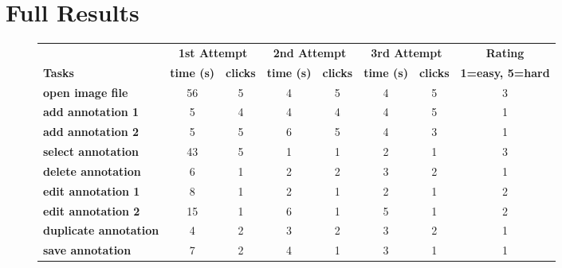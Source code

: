 \section{Full Results}
\label{Appendix}
\begin{figure}[ht]
	\begin{center}
		\begin{tabular}{ | l | c | c | c | c | c | c | c | }
			\hline
			& \multicolumn{2}{|c|}{\bf 1st Attempt} & \multicolumn{2}{|c|}{\bf 2nd Attempt} & \multicolumn{2}{|c|}{\bf 3rd Attempt} & \bf Rating \\
			\bf Tasks & \bf time (s) & \bf clicks & \bf time (s) & \bf clicks & \bf time (s) & \bf clicks & \bf 1=easy, 5=hard \\
			\hline \hline
			\bf open image file & 56 & 5 & 4 & 5 & 4 & 5 & 3 \\
			\bf add annotation 1 & 5 & 4 & 4 & 4 & 4 & 5 & 1 \\
			\bf add annotation 2 & 5 & 5 & 6 & 5 & 4 & 3 & 1 \\
			\bf select annotation & 43 & 5 & 1 & 1 & 2 & 1 & 3 \\
			\bf delete annotation & 6 & 1 & 2 & 2 & 3 & 2 & 1 \\
			\bf edit annotation 1 & 8 & 1 & 2 & 1 & 2 & 1 & 2 \\
			\bf edit annotation 2 & 15 & 1 & 6 & 1 & 5 & 1 & 2 \\
			\bf duplicate annotation & 4 & 2 & 3 & 2 & 3 & 2 & 1 \\
			\bf save annotation & 7 & 2 & 4 & 1 & 3 & 1 & 1 \\
			\hline
		\end{tabular}
		
	\end{center}
\end{figure}
